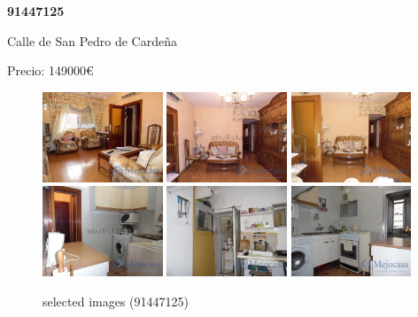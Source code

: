 \documentclass[10pt,a4paper]{report}
\begin{document}
\newpage
\begin{center}
\begin{large}
\textbf{91447125}\\[10px]
\end{large}
Calle de San Pedro de Cardeña
\end{center}
Precio: 149000€
\begin{figure}[htbp]

\includegraphics[width=0.32\textwidth]{arfima/91447125/91447125-001.jpg}
\includegraphics[width=0.32\textwidth]{arfima/91447125/91447125-002.jpg}
\includegraphics[width=0.32\textwidth]{arfima/91447125/91447125-003.jpg}
\includegraphics[width=0.32\textwidth]{arfima/91447125/91447125-004.jpg}
\includegraphics[width=0.32\textwidth]{arfima/91447125/91447125-005.jpg}
\includegraphics[width=0.32\textwidth]{arfima/91447125/91447125-006.jpg}
\caption{selected images (91447125)}
\end{figure}
\end{document}
